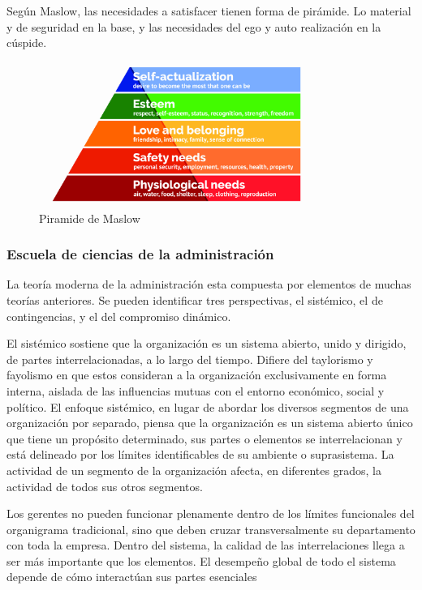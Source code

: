 \documentclass[titlepage,a4paper]{article}
\begin{document}
Según Maslow, las necesidades a satisfacer tienen forma de pirámide. Lo material y de seguridad en la base, y las necesidades del ego y auto realización en la cúspide.

\begin{figure}[!htb]
    \centering
    \includegraphics[width=0.8\textwidth]{imagenes/Maslows-pyramid.jpg}
    \caption{Piramide de Maslow}
\end{figure}

\subsubsection*{Escuela de ciencias de la administración}
La teoría moderna de la administración esta compuesta por elementos de muchas teorías anteriores. Se pueden identificar tres perspectivas, el sistémico, el de contingencias, y el del compromiso dinámico.

El sistémico sostiene que la organización es un sistema abierto, unido y dirigido, de partes interrelacionadas, a lo largo del tiempo. Difiere del taylorismo y fayolismo en que estos consideran a la organización exclusivamente en forma interna, aislada de las influencias mutuas con el entorno económico, social y político. El enfoque sistémico, en lugar de abordar los diversos segmentos de una organización por separado, piensa que la organización es un sistema abierto único que tiene un propósito determinado, sus partes o elementos se interrelacionan y está delineado por los límites identificables de su ambiente o suprasistema. La actividad de un segmento de la organización afecta, en diferentes grados, la actividad de todos sus otros segmentos. 

Los gerentes no pueden funcionar plenamente dentro de los límites funcionales del organigrama tradicional, sino que deben cruzar transversalmente su departamento con toda la empresa. Dentro del sistema, la calidad de las interrelaciones llega a ser más importante que los elementos. El desempeño global de todo el sistema depende de cómo interactúan sus partes esenciales
\end{document}
